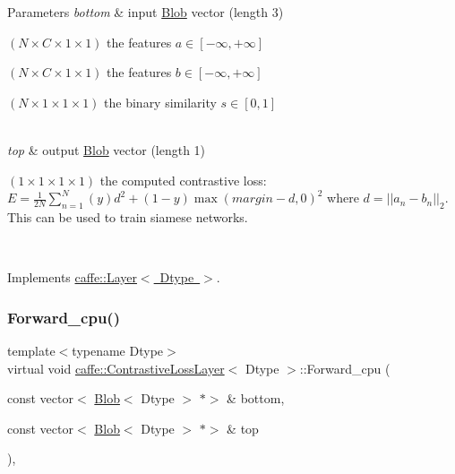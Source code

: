 \begin{DoxyParams}{Parameters}
{\em bottom} & input \mbox{\hyperlink{classcaffe_1_1_blob}{Blob}} vector (length 3)
\begin{DoxyEnumerate}
\item $ (N \times C \times 1 \times 1) $ the features $ a \in [-\infty, +\infty]$
\item $ (N \times C \times 1 \times 1) $ the features $ b \in [-\infty, +\infty]$
\item $ (N \times 1 \times 1 \times 1) $ the binary similarity $ s \in [0, 1]$ 
\end{DoxyEnumerate}\\
\hline
{\em top} & output \mbox{\hyperlink{classcaffe_1_1_blob}{Blob}} vector (length 1)
\begin{DoxyEnumerate}
\item $ (1 \times 1 \times 1 \times 1) $ the computed contrastive loss\+: $ E = \frac{1}{2N} \sum\limits_{n=1}^N \left(y\right) d^2 + \left(1-y\right) \max \left(margin-d, 0\right)^2 $ where $ d = \left| \left| a_n - b_n \right| \right|_2 $. This can be used to train siamese networks. 
\end{DoxyEnumerate}\\
\hline
\end{DoxyParams}


Implements \mbox{\hyperlink{classcaffe_1_1_layer_a576ac6a60b1e99fe383831f52a6cea77}{caffe\+::\+Layer$<$ Dtype $>$}}.

\mbox{\label{classcaffe_1_1_contrastive_loss_layer_aad90e509c2f7ebd3a36054101d1d15fb}} 
\subsubsection{\texorpdfstring{Forward\+\_\+cpu()}{Forward\_cpu()}\hspace{0.1cm}{\footnotesize\ttfamily [2/2]}}
{\footnotesize\ttfamily template$<$typename Dtype$>$ \\
virtual void \mbox{\hyperlink{classcaffe_1_1_contrastive_loss_layer}{caffe\+::\+Contrastive\+Loss\+Layer}}$<$ Dtype $>$\+::Forward\+\_\+cpu (\begin{DoxyParamCaption}\item[{const vector$<$ \mbox{\hyperlink{classcaffe_1_1_blob}{Blob}}$<$ Dtype $>$ $\ast$$>$ \&}]{bottom,  }\item[{const vector$<$ \mbox{\hyperlink{classcaffe_1_1_blob}{Blob}}$<$ Dtype $>$ $\ast$$>$ \&}]{top }\end{DoxyParamCaption})\hspace{0.3cm}{\ttfamily [protected]}, {\ttfamily [virtual]}}



